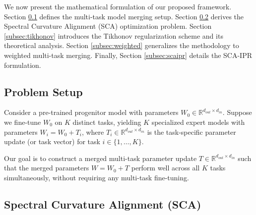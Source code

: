 \documentclass{article}
\theoremstyle{plain}
\theoremstyle{definition}
\theoremstyle{remark}
\begin{document}
We now present the mathematical formulation of our proposed framework. 
Section \ref{subsec:problem} defines the multi-task model merging setup. 
Section \ref{subsec:sca} derives the Spectral Curvature Alignment (SCA) optimization problem. 
Section \ref{subsec:tikhonov} introduces the Tikhonov regularization scheme and its theoretical analysis. 
Section \ref{subsec:weighted} generalizes the methodology to weighted multi-task merging. 
Finally, Section \ref{subsec:scaipr} details the SCA-IPR formulation.

\subsection{Problem Setup}
\label{subsec:problem}

Consider a pre-trained progenitor model with parameters $W_0 \in \mathbb{R}^{d_{out} \times d_{in}}$. 
Suppose we fine-tune $W_0$ on $K$ distinct tasks, yielding $K$ specialized expert models with parameters $W_i = W_0 + T_i$, where $T_i \in \mathbb{R}^{d_{out} \times d_{in}}$ is the task-specific parameter update (or task vector) for task $i \in \{1, \dots, K\}$.

Our goal is to construct a merged multi-task parameter update $T \in \mathbb{R}^{d_{out} \times d_{in}}$ such that the merged parameters $W = W_0 + T$ perform well across all $K$ tasks simultaneously, without requiring any multi-task fine-tuning.

\subsection{Spectral Curvature Alignment (SCA)}
\label{subsec:sca}
\end{document}
